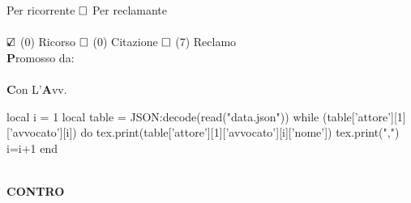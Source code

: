 \documentclass{article}
\begin{document}
Per ricorrente	
\hspace{1.0cm}		
$\text{\rlap{}}\square$
Per reclamante\vspace{0.5cm}\\
\vspace{0.5cm}\\
$\text{\rlap{$\checkmark$}}\square$
(0) Ricorso
\hspace{1.5cm}		
$\text{\rlap{}}\square$
(0) Citazione 
\hspace{1.5cm}	
$\text{\rlap{}}\square$
(7) Reclamo\vspace*{0.5cm}\\
\tiny{\textbf{P}romosso da:}\\
\\
\textbf{C}\tiny{on L'}\textbf{A}\tiny{vv.} 
\begin{luacode}
 local i = 1
 local table = JSON:decode(read("data.json"))
     while (table['attore'][1]['avvocato'][i]) do    	  
	  tex.print(table['attore'][1]['avvocato'][i]['nome'])
	  tex.print(",")
	  i=i+1
     end
\end{luacode}
\\
\textbf{C}\tiny{\textbf{ONTRO}}
\\
\end{document}
